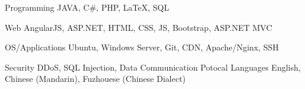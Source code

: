 

\begin{cvskills}

  \cvskill
    {Programming} %
    {JAVA, C\#, PHP, LaTeX, SQL} %

  \cvskill
    {Web} %
    { AngularJS, ASP.NET, HTML, CSS, JS, Bootstrap, ASP.NET MVC} %

  \cvskill
    {OS/Applications} %
    {Ubuntu, Windows Server, Git, CDN, Apache/Nginx, SSH} %

  \cvskill
    {Security} %
    {DDoS, SQL Injection, Data Communication Potocal} %
  \cvskill
    {Languages} %
    {English, Chinese (Mandarin), Fuzhouese (Chinese Dialect)} %

\end{cvskills}


